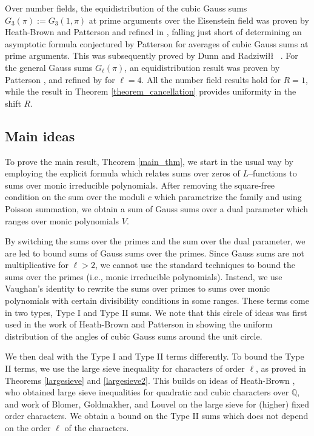 \documentclass[12pt]{amsart}
\begin{document}
Over number fields, the equidistribution of the cubic Gauss sums $G_3(\pi) := G_{3}(1,\pi)$ at prime arguments over the Eisenstein field was proven by Heath-Brown and Patterson \cite{hbp} and refined  in \cite{HB00}, falling just short of determining an asymptotic formula conjectured by Patterson for averages of cubic Gauss sums at prime arguments. This was subsequently proved by Dunn and Radziwi\l\l~ \cite{DR}. For the general Gauss sums $G_\ell(\pi)$, an equidistribution result was proven by Patterson \cite{LMS},  and refined  by \cite{DDHL} for $\ell=4$.
All the number field results hold for $R=1$, while the
result in Theorem \ref{theorem_cancellation} provides uniformity in the shift $R$.


\subsection{Main ideas}

To prove the main result, Theorem \ref{main_thm}, we start in the usual way by employing the explicit formula which relates sums over zeros of $L$--functions to sums over monic irreducible polynomials. After removing the square-free condition on the sum over the moduli $c$ which parametrize the family and using Poisson summation, we obtain a sum of Gauss sums over a dual parameter which ranges over monic polynomials $V$.

By switching the sums over the primes and the sum over the dual parameter, we are led to bound sums of Gauss sums over the primes. Since Gauss sums are not multiplicative for $\ell>2$, we cannot use the standard techniques to bound the sums over the primes (i.e., monic irreducible polynomials). Instead, we
use Vaughan's identity to rewrite the sums over primes to sums over monic polynomials with certain divisibility conditions in some ranges. These terms come in two types, Type I and Type II sums. We note that this circle of ideas
was first used in the work of Heath-Brown and Patterson \cite{hbp} in showing the uniform distribution of the angles of cubic Gauss sums around the unit circle.


We then deal with the Type I and Type II terms differently. To bound  the Type II terms, we use the large sieve inequality for characters of order $\ell$, as proved in Theorems \ref{largesieve} and \ref{largesieve2}. This builds on ideas of Heath-Brown \cite{HB95, HB00}, who obtained large sieve inequalities for quadratic and cubic characters over $\mathbb{Q}$, and work of Blomer, Goldmakher, and Louvel \cite{bgl} on the large sieve for (higher) fixed order characters. We obtain a bound on the Type II sums which does not depend on the order $\ell$ of the characters.
\end{document}
